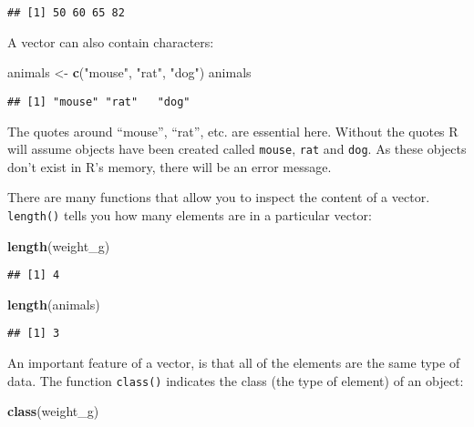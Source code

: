 \documentclass[]{book}
\newenvironment{Shaded}{\begin{snugshade}}{\end{snugshade}}
\newcommand{\KeywordTok}[1]{\textcolor[rgb]{0.13,0.29,0.53}{\textbf{#1}}}
\newcommand{\StringTok}[1]{\textcolor[rgb]{0.31,0.60,0.02}{#1}}
\newcommand{\NormalTok}[1]{#1}
\begin{document}
\begin{verbatim}
## [1] 50 60 65 82
\end{verbatim}

A vector can also contain characters:

\begin{Shaded}
\begin{Highlighting}[]
\NormalTok{animals <-}\StringTok{ }\KeywordTok{c}\NormalTok{(}\StringTok{"mouse"}\NormalTok{, }\StringTok{"rat"}\NormalTok{, }\StringTok{"dog"}\NormalTok{)}
\NormalTok{animals}
\end{Highlighting}
\end{Shaded}

\begin{verbatim}
## [1] "mouse" "rat"   "dog"
\end{verbatim}

The quotes around ``mouse'', ``rat'', etc. are essential here. Without
the quotes R will assume objects have been created called
\texttt{mouse}, \texttt{rat} and \texttt{dog}. As these objects don't
exist in R's memory, there will be an error message.

There are many functions that allow you to inspect the content of a
vector. \texttt{length()} tells you how many elements are in a
particular vector:

\begin{Shaded}
\begin{Highlighting}[]
\KeywordTok{length}\NormalTok{(weight_g)}
\end{Highlighting}
\end{Shaded}

\begin{verbatim}
## [1] 4
\end{verbatim}

\begin{Shaded}
\begin{Highlighting}[]
\KeywordTok{length}\NormalTok{(animals)}
\end{Highlighting}
\end{Shaded}

\begin{verbatim}
## [1] 3
\end{verbatim}

An important feature of a vector, is that all of the elements are the
same type of data. The function \texttt{class()} indicates the class
(the type of element) of an object:

\begin{Shaded}
\begin{Highlighting}[]
\KeywordTok{class}\NormalTok{(weight_g)}
\end{Highlighting}
\end{Shaded}
\end{document}
